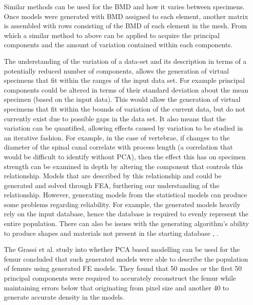 Similar methods can be used for the BMD and how it varies between
specimens. Once models were generated with BMD assigned to each element,
another matrix is assembled with rows consisting of the BMD of each
element in the mesh. From which a similar method to above can be applied
to acquire the principal components and the amount of variation
contained within each components.

The understanding of the variation of a data-set and its description in terms of a potentially reduced number of components, allows the generation of virtual specimens that fit within the ranges of the input data set.
For example principal components could be altered in terms of their standard deviation about the mean specimen (based on the input data).
This would allow the generation of virtual specimens that fit within the bounds of variation of the current data, but do not currently exist due to possible gaps in the data set.
It also means that the variation can be quantified, allowing effects caused by variation to be studied in an iterative fashion.
For example, in the case of vertebrae, if changes to the diameter of the spinal canal correlate with process length (a correlation that would be difficult to identify without PCA), then the effect this has on specimen strength can be examined in depth by altering the component that controls this relationship.
Models that are described by this relationship and could be generated and solved through FEA, furthering our understanding of the relationship.
However, generating models from the statistical models can produce some problems
regarding reliability. For example, the generated models heavily rely on
the input database, hence the database is required to evenly represent
the entire population. There can also be issues with the generating
algorithm's ability to produce shapes and materials not present in the
starting database \cite{Grassi2014}, \cite{Vaananen2015}.

The Grassi et al. study \cite{Grassi2014} into whether PCA based modelling can
be
used for the femur concluded that such generated models were able to
describe the population of femurs using generated FE models. They found
that 50 modes or the first 50 principal components were required to
accurately reconstruct the femur while maintaining errors below that
originating from pixel size and another 40 to generate accurate density
in the models.

